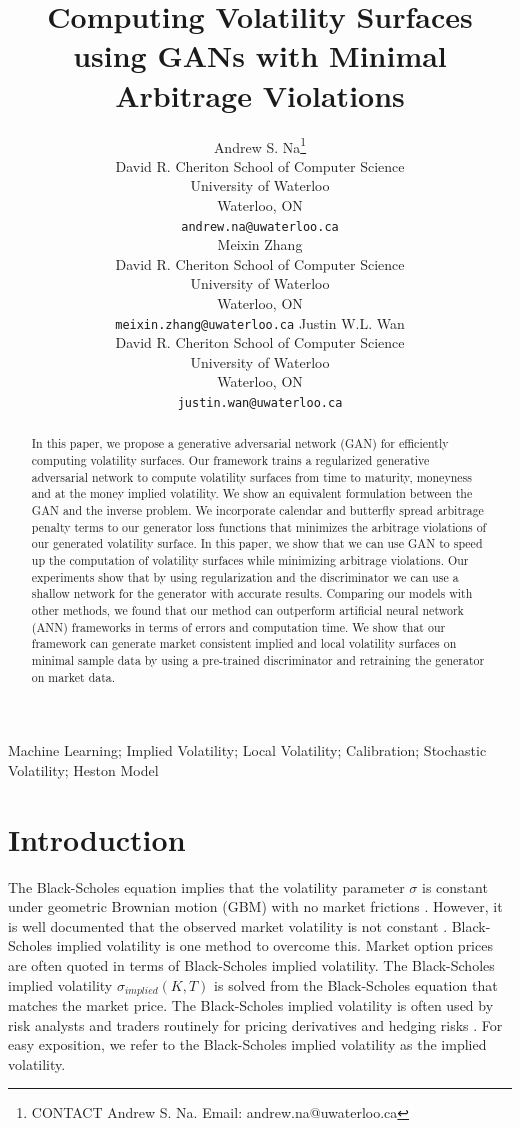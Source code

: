 \documentclass{article}
\title{Computing Volatility Surfaces using GANs with Minimal Arbitrage Violations}
\author{{Andrew S. Na}\thanks{CONTACT Andrew S. Na. Email: andrew.na@uwaterloo.ca}\hspace{1.5mm}\\
	David R. Cheriton School of Computer Science\\
	University of Waterloo\\
	Waterloo, ON\\
	\texttt{andrew.na@uwaterloo.ca} \\
	\And
	{Meixin Zhang} \\
	David R. Cheriton School of Computer Science\\
	University of Waterloo\\
	Waterloo, ON\\
	\texttt{meixin.zhang@uwaterloo.ca}
	\And
	{Justin W.L. Wan} \\
	David R. Cheriton School of Computer Science\\
	University of Waterloo\\
	Waterloo, ON\\
	\texttt{justin.wan@uwaterloo.ca}
}
\theoremstyle{plain}%
\theoremstyle{definition}
\theoremstyle{remark}
\begin{document}
\maketitle

\begin{abstract}
In this paper, we propose a generative adversarial network (GAN) for efficiently computing volatility surfaces. Our framework trains a regularized generative adversarial network to compute volatility surfaces from time to maturity, moneyness and at the money implied volatility. We show an equivalent formulation between the GAN and the inverse problem. We incorporate calendar and butterfly spread arbitrage penalty terms to our generator loss functions that minimizes the arbitrage violations of our generated volatility surface. In this paper, we show that we can use GAN to speed up the computation of volatility surfaces while minimizing arbitrage violations. Our experiments show that by using regularization and the discriminator we can use a shallow network for the generator with accurate results. Comparing our models with other methods, we found that our method can outperform artificial neural network (ANN) frameworks in terms of errors and computation time. We show that our framework can generate market consistent implied and local volatility surfaces on minimal sample data by using a pre-trained discriminator and retraining the generator on market data.
\end{abstract}

\begin{keywords}
Machine Learning; Implied Volatility; Local Volatility; Calibration; Stochastic Volatility; Heston Model
\end{keywords}

\section{Introduction}
The Black-Scholes equation implies that the volatility parameter $\sigma$ is constant under geometric Brownian motion (GBM) with no market frictions \citep{cont-2002, lee-2002}. However, it is well documented that the observed market volatility is not constant \citep{lee-2002}. Black-Scholes implied volatility is one method to overcome this. Market option prices are often quoted in terms of Black-Scholes implied volatility. The Black-Scholes implied volatility $\sigma_{implied}(K,T)$ is solved from the Black-Scholes equation that matches the market price. The Black-Scholes implied volatility is often used by risk analysts and traders routinely for pricing derivatives and hedging risks \citep{cont-2002}. For easy exposition, we refer to the Black-Scholes implied volatility as the implied volatility.  
\end{document}
